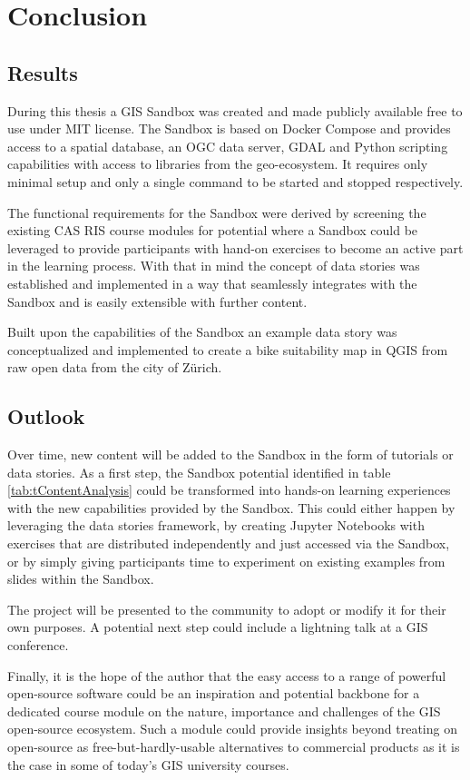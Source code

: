 \documentclass[11pt, a4paper, oneside, parskip=full-]{scrartcl}
\begin{document}
\section{Conclusion}

\subsection{Results}
During this thesis a GIS Sandbox was created and made publicly available free to
use under MIT license\cite{osgeostacksandbox}. The Sandbox is based on Docker
Compose and provides access to a spatial database, an OGC data server, GDAL and
Python scripting capabilities with access to libraries from the geo-ecosystem.
It requires only minimal setup and only a single command to be started and
stopped respectively.

The functional requirements for the Sandbox were derived by screening the
existing CAS RIS course modules for potential where a Sandbox could be leveraged
to provide participants with hand-on exercises to become an active part in the
learning process. With that in mind the concept of data stories was established
and implemented in a way that seamlessly integrates with the Sandbox and is
easily extensible with further content.

Built upon the capabilities of the Sandbox an example data story was
conceptualized and implemented to create a bike suitability map in QGIS from raw
open data from the city of Zürich.

\subsection{Outlook}
Over time, new content will be added to the Sandbox in the form of tutorials or
data stories. As a first step, the Sandbox potential identified in table
\ref{tab:tContentAnalysis} could be transformed into hands-on learning
experiences with the new capabilities provided by the Sandbox. This could either
happen by leveraging the data stories framework, by creating Jupyter Notebooks
with exercises that are distributed independently and just accessed via the
Sandbox, or by simply giving participants time to experiment on existing
examples from slides within the Sandbox.

The project will be presented to the community to adopt or modify it for their
own purposes. A potential next step could include a lightning talk at a GIS
conference.

Finally, it is the hope of the author that the easy access to a range of
powerful open-source software could be an inspiration and potential backbone for
a dedicated course module on the nature, importance and challenges of the GIS
open-source ecosystem. Such a module could provide insights beyond treating on
open-source as free-but-hardly-usable alternatives to commercial products as it
is the case in some of today's GIS university courses.

\newpage
\printbibliography
\end{document}
